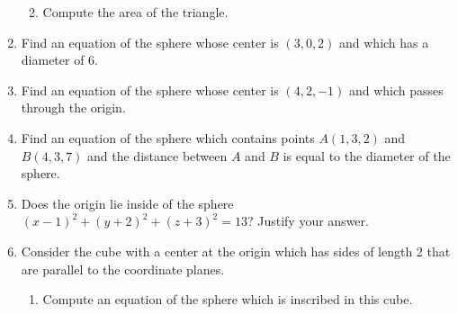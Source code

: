 \documentclass[12pt]{article}
\newif\ifans
\begin{document}
\begin{enumerate}
\begin{enumerate}
\ifans{\fbox{The length of all sides of the triangle is $\sqrt{24}$; Detailed Solution: \textcolor{blue}{\href{http://www.math.drexel.edu/classes/Calculus/resources/Math200HW/Solutions/01_200_Rectangular_04.pdf}{Here}}}} \fi

\item Compute the area of the triangle.

\ifans{\fbox{$6\sqrt{3}$ square units; Detailed Solution: \textcolor{blue}{\href{http://www.math.drexel.edu/classes/Calculus/resources/Math200HW/Solutions/01_200_Rectangular_04.pdf}{Here}}}} \fi

\end{enumerate}

\item Find an equation of the sphere whose center is $(3,0,2)$ and which has a diameter of 6.

\ifans{\fbox{$(x-3)^2+y^2+(z-2)^2=9$}} \fi

\item Find an equation of the sphere whose center is $(4,2,-1)$ and which passes through the origin.

\ifans{\fbox{$(x-4)^2+(y-2)^2+(z+1)^2=21$}} \fi

\item Find an equation of the sphere which contains points $A(1,3,2)$ and $B(4,3,7)$ and the distance between $A$ and $B$ is equal to the diameter of the sphere.

\ifans{\fbox{$\left(x-\frac{5}{2}\right)^2+(y-3)^2+\left(z-\frac{9}{2}\right)^2=\frac{17}{2}$; Video Solution: \textcolor{blue}{\href{https://www.youtube.com/watch?v=kX4rI7KYVa4}{Here}}}} \fi

\item Does the origin lie inside of the sphere $(x-1)^2+(y+2)^2+(z+3)^2=13$?  Justify your answer.

\ifans{\fbox{\parbox{1\linewidth}{No.  The distance from the origin to the center $(1,-2,-3)$ is $\sqrt{14}$ which is greater than the radius, $\sqrt{13}$.}}} \fi

\newpage

\item Consider the cube with a center at the origin which has sides of length 2 that are parallel to the coordinate planes.  

\begin{enumerate}

\item Compute an equation of the sphere which is inscribed in this cube.


\end{enumerate}
\end{enumerate}
\end{document}
